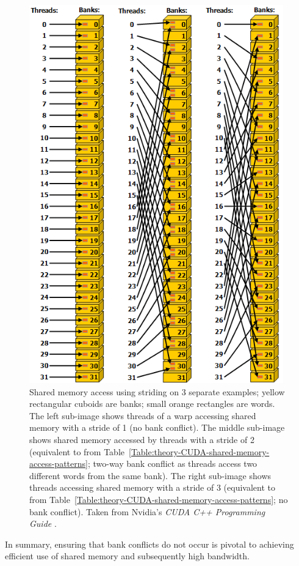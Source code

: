 \begin{figure}[ht!]
	\centering
	\includegraphics[width=11cm, keepaspectratio]{images/ch1/CUDA_shared_memory_banks_words_conflicts.png}
	\caption{Shared memory access using striding on 3 separate examples; yellow rectangular cuboids are banks; small orange rectangles are words. The left sub-image shows threads of a warp accessing shared memory with a stride of 1 (no bank conflict). The middle sub-image shows shared memory accessed by threads with a stride of 2 (equivalent to  from Table~\ref{Table:theory-CUDA-shared-memory-access-patterns}; two-way bank conflict as threads access two different words from the same bank). The right sub-image shows threads accessing shared memory with a stride of 3 (equivalent to  from Table~\ref{Table:theory-CUDA-shared-memory-access-patterns}; no bank conflict). Taken from Nvidia's \emph{CUDA C++ Programming Guide} \cite{NVIDIAMay2022}.}
	\label{Figure:theory-CUDA-shared-memory-banks-words-conflicts}
\end{figure}

In summary, ensuring that bank conflicts do not occur is pivotal to achieving efficient use of shared memory and subsequently high bandwidth.

